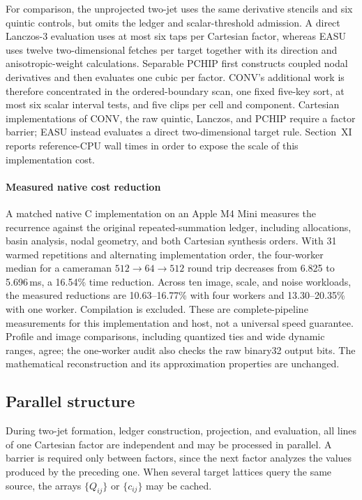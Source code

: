 \documentclass[journal]{IEEEtran}
\begin{document}
For comparison, the unprojected two-jet uses the same derivative stencils and
six quintic controls, but omits the ledger and scalar-threshold admission. A
direct Lanczos-3 evaluation uses at most six taps per Cartesian factor,
whereas EASU uses twelve two-dimensional fetches per target together with its
direction and anisotropic-weight calculations. Separable PCHIP first
constructs coupled nodal derivatives and then evaluates one cubic per factor.
CONV's additional work is therefore concentrated in the ordered-boundary
scan, one fixed five-key sort, at most six scalar interval tests, and five
clips per cell and component. Cartesian implementations of CONV, the raw
quintic, Lanczos, and PCHIP require a factor barrier; EASU instead evaluates a
direct two-dimensional target rule. Section~XI reports reference-CPU wall
times in order to expose the scale of this implementation cost.

\paragraph{Measured native cost reduction}
A matched native C implementation on an Apple M4 Mini measures the recurrence
against the original repeated-summation ledger, including allocations, basin
analysis, nodal geometry, and both Cartesian synthesis orders. With 31 warmed
repetitions and alternating implementation order, the four-worker median for
a cameraman \(512\to64\to512\) round trip decreases from 6.825 to
5.696\,ms, a 16.54\% time reduction. Across ten image, scale, and noise
workloads, the measured reductions are 10.63--16.77\% with four workers
and 13.30--20.35\% with one worker. Compilation is excluded. These are
complete-pipeline measurements for this implementation and host, not a
universal speed guarantee. Profile and image comparisons, including
quantized ties and wide dynamic ranges, agree; the one-worker audit also
checks the raw binary32 output bits. The mathematical reconstruction and
its approximation properties are unchanged.

\subsection{Parallel structure}

During two-jet formation, ledger construction, projection, and evaluation,
all lines of one Cartesian factor are independent and may be processed in
parallel. A barrier is required only between factors, since the next factor
analyzes the values produced by the preceding one. When several target
lattices query the same source, the arrays \(\{Q_{ij}\}\) or
\(\{c_{ij}\}\) may be cached.
\end{document}
